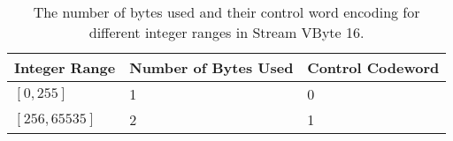 \begin{table}
    \caption{The number of bytes used and their control word encoding for different integer ranges in Stream VByte 16. \label{tab:svb-16}}
    \begin{tabular}{|l|l|l|}%
        \hline
        Integer Range & Number of Bytes Used & Control Codeword\\
        \hline
	$[0,255]$ & 1 & 0\\
	$[256,65535]$ & 2 & 1\\
        \hline
    \end{tabular}
\end{table}
